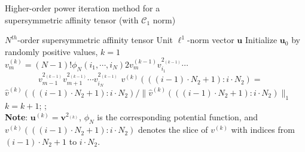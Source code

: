\begin{algorithm}[!t]
\caption{\small Higher-order power iteration method for a \protect\\
         \mbox{}\hspace{15ex}\small supersymmetric affinity tensor (with $\mathcal{C}_1$ norm)}
\label{alg2}
\begin{algorithmic}[1]
\REQUIRE \small $N^{th}$-order supersymmetric affinity tensor
\ENSURE  \small Unit $\mathcal{\ell}^1$-norm vector $\boldsymbol{u}$
\STATE   \small \; Initialize $\boldsymbol{u}_0$ by randomly positive values, $k=1$
\REPEAT
        \STATE $v_{m}^{(k)}=(N-1)!\phi_N(i_1,\cdots , i_N) 2v_{m}^{(k-1)}v_{i_1}^{2_{(k-1)}}\cdots$ \\
                 $\qquad \qquad v_{m-1}^{2_{(k-1)}}v_{m+1}^{2_{(k-1)}}\cdots v_{i_N}^{2_{(k-1)}}$
        \ENDFOR
        \STATE $v^{(k)}(((i-1)\cdot N_2+1) : i\cdot N_2)=$   \protect\\
               $\hat{v}^{(k)}(((i-1)\cdot N_2+1) : i\cdot N_2)/\lVert \hat{v}^{(k)}(((i-1)\cdot N_2+1):i\cdot N_2)\lVert_1$
        \ENDFOR
    \ENDFOR
    \STATE $k=k+1$;
;\protect\\
       \small \textbf{Note}: $\boldsymbol{u}^{(k)}=\boldsymbol{v}^{2_{(k)}}$, $\phi_N$ is the corresponding potential function,
       \small and $v^{(k)}(((i-1)\cdot N_2+1) : i\cdot N_2)$ denotes the slice of $v^{(k)}$ with
       \small indices from $(i-1)\cdot N_2+1$ to $i\cdot N_2$.
\end{algorithmic}
\end{algorithm}

